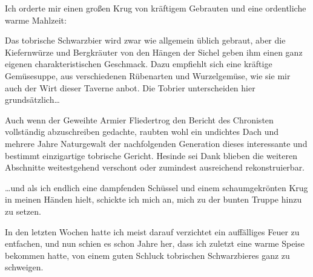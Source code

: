 Ich orderte mir einen großen Krug von kräftigem Gebrauten und eine ordentliche warme Mahlzeit:

Das tobrische Schwarzbier wird zwar wie allgemein üblich gebraut, aber die Kiefernwürze und Bergkräuter von den Hängen der Sichel geben ihm einen ganz eigenen charakteristischen Geschmack. Dazu empfiehlt sich eine kräftige Gemüsesuppe, aus verschiedenen Rübenarten und Wurzelgemüse, wie sie mir auch der Wirt dieser Taverne anbot. Die Tobrier unterscheiden hier grundsätzlich…

Auch wenn der Geweihte Armier Fliedertrog den Bericht des Chronisten vollständig abzuschreiben gedachte, raubten wohl ein undichtes Dach und mehrere Jahre Naturgewalt der nachfolgenden Generation dieses interessante und bestimmt einzigartige tobrische Gericht. Hesinde sei Dank blieben die weiteren Abschnitte weitestgehend verschont oder zumindest ausreichend rekonstruierbar.

…und als ich endlich eine dampfenden Schüssel und einem schaumgekrönten Krug in meinen Händen hielt, schickte ich mich an, mich zu der bunten Truppe hinzu zu setzen.

In den letzten Wochen hatte ich meist darauf verzichtet ein auffälliges Feuer zu entfachen, und nun schien es schon Jahre her, dass ich zuletzt eine warme Speise bekommen hatte, von einem guten Schluck tobrischen Schwarzbieres ganz zu schweigen.

